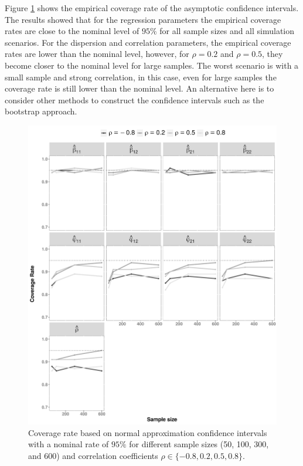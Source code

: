\documentclass[useAMS,referee]{biom}
\begin{document}
Figure \ref{fig1.4} shows the empirical coverage rate of the asymptotic confidence intervals. The results showed that for the regression parameters the empirical coverage rates are close to the nominal level of $95\%$ for all sample sizes and all simulation scenarios. For the dispersion and correlation parameters, the empirical coverage rates are lower than the nominal level, however, for $\rho = 0.2$ and $\rho = 0.5$, they become closer to the nominal level for large samples. The worst scenario is with a small sample and strong correlation, in this case, even for large samples the coverage rate is still lower than the nominal level. An alternative here is to consider other methods to construct the confidence intervals such as the bootstrap approach. 


\begin{figure}[htb]
\centering
\includegraphics[width=1\textwidth]{Figure_3}
\caption{Coverage rate based on normal approximation confidence intervals with a nominal rate of $95\%$ for different sample sizes (50, 100, 300, and 600)  and correlation coefficients $\rho\in\{-0.8, 0.2, 0.5, 0.8\}$.}
\label{fig1.4}
\end{figure}
\end{document}
